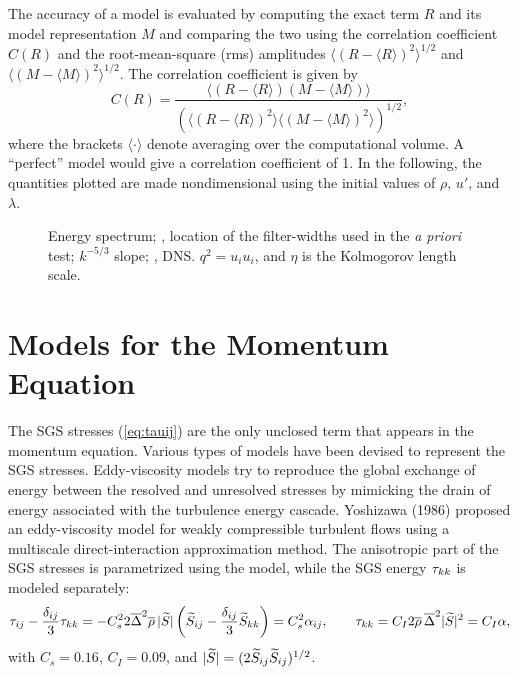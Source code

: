 \documentclass[tcfd]{svjour}
\begin{document}
The accuracy of a model is evaluated by computing the exact term $R$
and its model representation $M$ and comparing the two using the
correlation coeff\/icient $C(R)$ and the root-mean-square (rms) amplitudes
$\langle (R-\langle R\rangle)^2\rangle^{1/2}$ and $\langle(M-\langle
M\rangle)^2\rangle^{1/2}$. The correlation coeff\/icient is given by
\begin{equation}
 \label{eq:corr-coeff}
 C(R) = \frac{ \langle(R-\langle R \rangle) (M-\langle M \rangle) \rangle}
 {\left(\langle (R-\langle R \rangle)^2 \rangle
 \langle(M-\langle M \rangle)^2 \rangle\right)^{1/2}} ,
\end{equation}
where the brackets $\langle\cdot\rangle$ denote averaging over the
computational volume. A ``perfect'' model would give a correlation
coeff\/icient of 1. In the following, the quantities plotted are made
nondimensional using the initial values of $\rho$, $u'$, and
$\lambda$.

\begin{figure}[t]
\vspace{51mm}%
\caption{Energy spectrum; \diam, location of the f\/ilter-widths used
in the {\it a priori} test; \solid $k^{-5/3}$ slope; \dotted, DNS. $q^2 = u_iu_i$, and $\eta$ is
the Kolmogorov length scale.}
\label{fig:fig01}
\end{figure}


\section{Models for the Momentum Equation}
\label{sec:4}

The SGS stresses (\ref{eq:tauij}) are the only unclosed term that
appears in the momentum equation. Various types of models have been
devised to represent the SGS stresses. Eddy-viscosity models
try to reproduce the global exchange of energy between the resolved
and unresolved stresses by mimicking the drain of energy associated
with the turbulence energy cascade. Yoshizawa (1986)
proposed an eddy-viscosity model for weakly compressible turbulent
f\/lows using a multiscale direct-interaction approximation method.
The anisotropic part of the SGS stresses is parametrized using the
\citet{sma63} model, while the SGS energy $\tau_{kk}$ is
modeled separately:
\begin{equation}
 \label{eq:tauij-yoshi}
 \tau_{ij} - \frac{\delta_{ij}}{3}\tau_{kk} =
 - C_s^22\overline{\Delta}^2\overline{\rho}\,|\widetilde{S}|\left(\widetilde{S}_{ij}
 -\frac{\delta_{ij}}{3}\widetilde{S}_{kk}\right) = C_s^2\alpha_{ij}
 , \qquad
 \tau_{kk} = C_I 2\overline{\rho}\,\overline{\Delta}^2|\widetilde{S}|^2 = C_I \alpha,
\end{equation}
with $C_s=0.16$, $C_I=0.09$, and $|\widetilde{S}|=(2 \widetilde{S}_{ij}\widetilde{S}_{ij})^{1/2}$.
\end{document}
